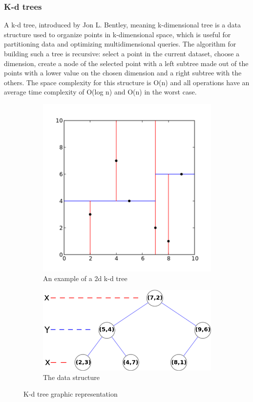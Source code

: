 \documentclass[12pt]{article}
\begin{document}
	\subsubsection{K-d trees}
	A k-d tree, introduced by Jon L. Bentley\cite{KdTree}, meaning k-dimensional tree is a data structure used to organize points in k-dimensional space, which is useful for partitioning data and optimizing multidimensional queries. The algorithm for building such a tree is recursive: select a point in the current dataset, choose a dimension, create a node of the selected point with a left subtree made out of the points with a lower value on the chosen dimension and a right subtree with the others. The space complexity for this structure is O(n) and all operations have an average time complexity of O(log n) and O(n) in the worst case. 
	
	\begin{figure}
		\centering
		\begin{subfigure}{.5\textwidth}
			\centering
			\includegraphics[width=.9\linewidth]{Kdtree_2d.png}
			\caption{An example of a 2d k-d tree\cite{KdTreeFig1}}
		\end{subfigure}%
		\begin{subfigure}{.5\textwidth}
			\centering
			\includegraphics[width=.9\linewidth]{Tree_0001.png}
			\caption{The data structure\cite{KdTreeFig2}}
		\end{subfigure}
		\caption{K-d tree graphic representation}
		\label{fig:kdtree}
	\end{figure}
	
\end{document}
